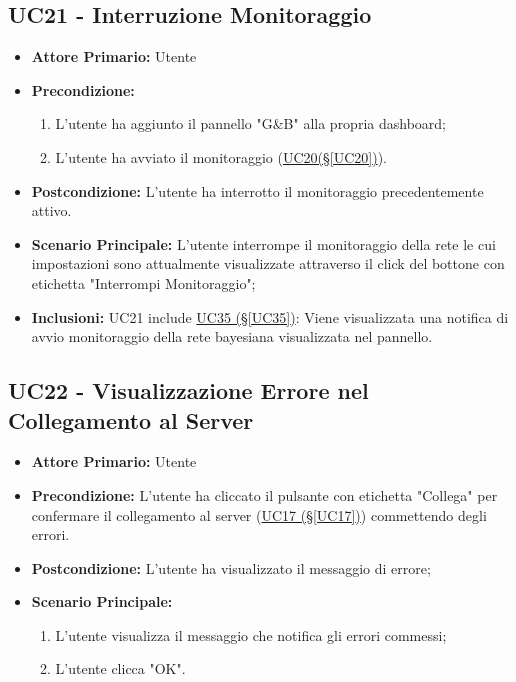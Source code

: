 \pagebreak

\subsection{UC21 - Interruzione Monitoraggio}\label{UC21}

\begin{itemize}
	\item \textbf{Attore Primario:} Utente
	\item \textbf{Precondizione:}
	\begin{enumerate}
		\item L'utente ha aggiunto il pannello "G\&B" alla propria dashboard;
		\item L'utente ha avviato il monitoraggio (\hyperref[UC20]{UC20(§\ref*{UC20})}).
	\end{enumerate}
	\item \textbf{Postcondizione:} L'utente ha interrotto il monitoraggio precedentemente attivo.
	\item \textbf{Scenario Principale:} L'utente interrompe il monitoraggio della rete le cui impostazioni sono attualmente visualizzate attraverso il click del bottone con etichetta "Interrompi Monitoraggio";
	\item \textbf{Inclusioni:} UC21 include \hyperref[UC35]{UC35 (§\ref*{UC35})}: Viene visualizzata una notifica di avvio monitoraggio della rete bayesiana visualizzata nel pannello.
\end{itemize}

\pagebreak

\subsection{UC22 - Visualizzazione Errore nel Collegamento al Server}\label{UC22}
\begin{itemize}
	\item \textbf{Attore Primario:}  Utente
	\item \textbf{Precondizione:} L'utente ha cliccato il pulsante con etichetta "Collega" per confermare il collegamento al server (\hyperref[UC17]{UC17 (§\ref*{UC17})}) commettendo degli errori.
	\item \textbf{Postcondizione:} L'utente ha visualizzato il messaggio di errore;
	\item \textbf{Scenario Principale:}
	\begin{enumerate}
		\item L'utente visualizza il messaggio che notifica gli errori commessi;
		\item L'utente clicca "OK".
	\end{enumerate}
\end{itemize}


